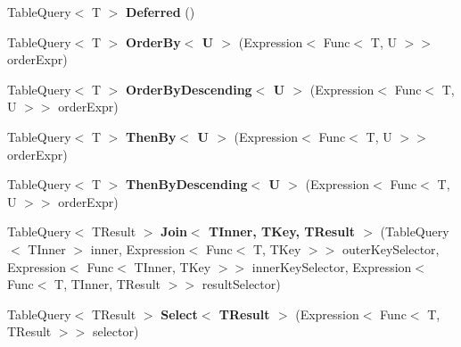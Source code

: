\begin{DoxyCompactItemize}
\item 
\hypertarget{classSQLite_1_1TableQuery_3_01T_01_4_a158964fb1e56e6679ab94cf101dcc6b3}{Table\-Query$<$ T $>$ {\bfseries Deferred} ()}\label{classSQLite_1_1TableQuery_3_01T_01_4_a158964fb1e56e6679ab94cf101dcc6b3}

\item 
\hypertarget{classSQLite_1_1TableQuery_3_01T_01_4_ae35684d62851a521aac3419af0c565fb}{Table\-Query$<$ T $>$ {\bfseries Order\-By$<$ U $>$} (Expression$<$ Func$<$ T, U $>$$>$ order\-Expr)}\label{classSQLite_1_1TableQuery_3_01T_01_4_ae35684d62851a521aac3419af0c565fb}

\item 
\hypertarget{classSQLite_1_1TableQuery_3_01T_01_4_aacf40c5e9162c7f25ebdb78a2811aec9}{Table\-Query$<$ T $>$ {\bfseries Order\-By\-Descending$<$ U $>$} (Expression$<$ Func$<$ T, U $>$$>$ order\-Expr)}\label{classSQLite_1_1TableQuery_3_01T_01_4_aacf40c5e9162c7f25ebdb78a2811aec9}

\item 
\hypertarget{classSQLite_1_1TableQuery_3_01T_01_4_a8fd46c541dda61605ecdcada1684b9b7}{Table\-Query$<$ T $>$ {\bfseries Then\-By$<$ U $>$} (Expression$<$ Func$<$ T, U $>$$>$ order\-Expr)}\label{classSQLite_1_1TableQuery_3_01T_01_4_a8fd46c541dda61605ecdcada1684b9b7}

\item 
\hypertarget{classSQLite_1_1TableQuery_3_01T_01_4_a589fb8db3bbfe57b0f08aeea32e574ee}{Table\-Query$<$ T $>$ {\bfseries Then\-By\-Descending$<$ U $>$} (Expression$<$ Func$<$ T, U $>$$>$ order\-Expr)}\label{classSQLite_1_1TableQuery_3_01T_01_4_a589fb8db3bbfe57b0f08aeea32e574ee}

\item 
\hypertarget{classSQLite_1_1TableQuery_3_01T_01_4_a292ef3b90067c4393cf377c369d942a1}{Table\-Query$<$ T\-Result $>$ {\bfseries Join$<$ T\-Inner, T\-Key, T\-Result $>$} (Table\-Query$<$ T\-Inner $>$ inner, Expression$<$ Func$<$ T, T\-Key $>$$>$ outer\-Key\-Selector, Expression$<$ Func$<$ T\-Inner, T\-Key $>$$>$ inner\-Key\-Selector, Expression$<$ Func$<$ T, T\-Inner, T\-Result $>$$>$ result\-Selector)}\label{classSQLite_1_1TableQuery_3_01T_01_4_a292ef3b90067c4393cf377c369d942a1}

\item 
\hypertarget{classSQLite_1_1TableQuery_3_01T_01_4_a3726c9bfa1bb9a0efa35f847a3d9d77e}{Table\-Query$<$ T\-Result $>$ {\bfseries Select$<$ T\-Result $>$} (Expression$<$ Func$<$ T, T\-Result $>$$>$ selector)}\label{classSQLite_1_1TableQuery_3_01T_01_4_a3726c9bfa1bb9a0efa35f847a3d9d77e}


\end{DoxyCompactItemize}
